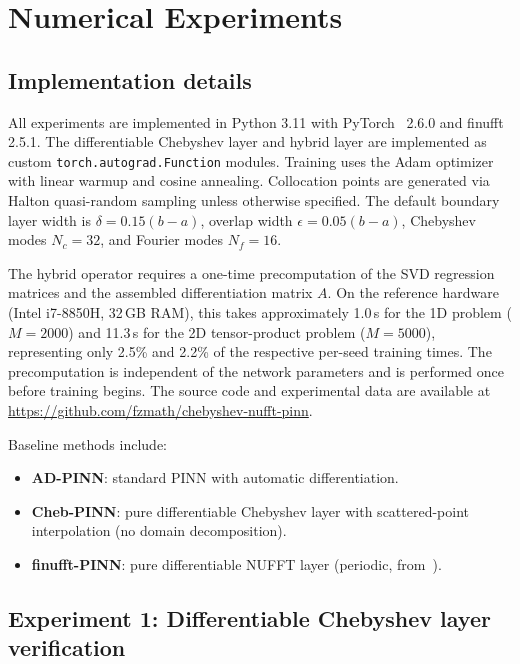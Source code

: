 \documentclass[sn-mathphys,Numbered]{sn-jnl}
\theoremstyle{thmstyleone}
\theoremstyle{thmstyletwo}
\theoremstyle{thmstylethree}
\begin{document}
\section{Numerical Experiments}\label{sec:experiments}

\subsection{Implementation details}\label{subsec:impl}
All experiments are implemented in Python 3.11 with PyTorch~\cite{paszke2019pytorch} 2.6.0 and finufft 2.5.1. The differentiable Chebyshev layer and hybrid layer are implemented as custom \texttt{torch.autograd.Function} modules. Training uses the Adam optimizer with linear warmup and cosine annealing. Collocation points are generated via Halton quasi-random sampling unless otherwise specified. The default boundary layer width is $\delta = 0.15(b-a)$, overlap width $\epsilon = 0.05(b-a)$, Chebyshev modes $N_c = 32$, and Fourier modes $N_f = 16$.

The hybrid operator requires a one-time precomputation of the SVD regression matrices and the assembled differentiation matrix $A$. On the reference hardware (Intel i7-8850H, 32\,GB RAM), this takes approximately 1.0\,s for the 1D problem ($M=2000$) and 11.3\,s for the 2D tensor-product problem ($M=5000$), representing only 2.5\% and 2.2\% of the respective per-seed training times. The precomputation is independent of the network parameters and is performed once before training begins. The source code and experimental data are available at \url{https://github.com/fzmath/chebyshev-nufft-pinn}.

Baseline methods include:
\begin{itemize}
    \item \textbf{AD-PINN}: standard PINN with automatic differentiation.
    \item \textbf{Cheb-PINN}: pure differentiable Chebyshev layer with scattered-point interpolation (no domain decomposition).
    \item \textbf{finufft-PINN}: pure differentiable NUFFT layer (periodic, from~\cite{wang2026differentiable}).
\end{itemize}

\subsection{Experiment 1: Differentiable Chebyshev layer verification}\label{subsec:exp1}
\end{document}
